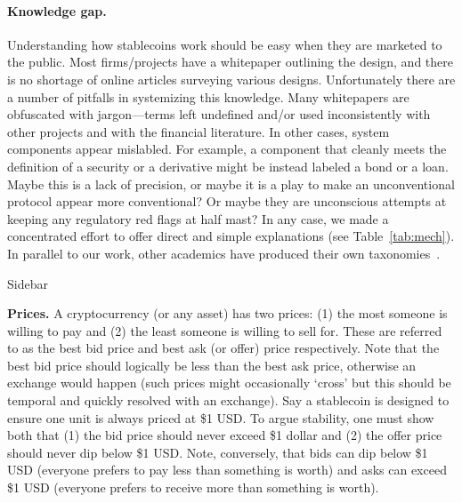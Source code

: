 \paragraph{Knowledge gap.} Understanding how stablecoins work should be easy when they are marketed to the public. Most firms/projects have a whitepaper outlining the design, and there is no shortage of online articles surveying various designs. Unfortunately there are a number of pitfalls in systemizing this knowledge. Many whitepapers are obfuscated with jargon---terms left undefined and/or used inconsistently with other projects and with the financial literature. In other cases, system components appear mislabled. For example, a component that cleanly meets the definition of a security or a derivative might be instead labeled a bond or a loan. Maybe this is a lack of precision, or maybe it is a play to make an unconventional protocol appear more conventional? Or maybe they are unconscious attempts at keeping any regulatory red flags at half mast? In any case, we made a concentrated effort to offer direct and simple explanations (see Table~\ref{tab:mech}). In parallel to our work, other academics have produced their own taxonomies~\cite{PHP+19,MSS20}.

	
\begin{Sidebar*}[h!]
\begin{framed}
Sidebar
\begin{flushleft}
\textbf{Prices.} A cryptocurrency (or any asset) has two prices: (1) the most someone is willing to pay and (2) the least someone is willing to sell for. These are referred to as the best bid price and best ask (or offer) price respectively. Note that the best bid price should logically be less than the best ask price, otherwise an exchange would happen (such prices might occasionally `cross' but this should be temporal and quickly resolved with an exchange). Say a stablecoin is designed to ensure one unit is always priced at \$1 USD. To argue stability, one must show both that (1) the bid price should never exceed \$1 dollar and (2) the offer price should never dip below \$1 USD. Note, conversely, that bids can dip below \$1 USD (everyone prefers to pay less than something is worth) and asks can exceed \$1 USD (everyone prefers to receive more than something is worth).
\end{flushleft}
\end{framed}
\end{Sidebar*}


